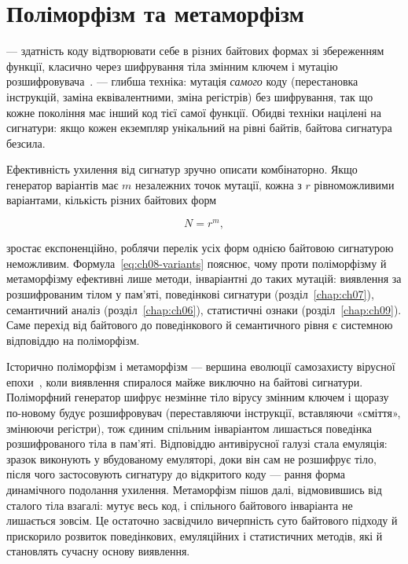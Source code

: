 \section{Поліморфізм та метаморфізм}\label{sec:ch08-poly}

 --- здатність коду відтворювати себе в різних байтових формах зі збереженням функції, класично через шифрування тіла змінним ключем і мутацію розшифровувача~\cite{szor}.  --- глибша техніка: мутація \emph{самого} коду (перестановка інструкцій, заміна еквівалентними, зміна регістрів) без шифрування, так що кожне покоління має інший код тієї самої функції. Обидві техніки націлені на сигнатури: якщо кожен екземпляр унікальний на рівні байтів, байтова сигнатура безсила.

Ефективність ухилення від сигнатур зручно описати комбінаторно. Якщо генератор варіантів має $m$ незалежних точок мутації, кожна з $r$ рівноможливими варіантами, кількість різних байтових форм

\begin{equation}
N = r^{m},
\label{eq:ch08-variants}
\end{equation}

зростає експоненційно, роблячи перелік усіх форм однією байтовою сигнатурою неможливим. Формула~\eqref{eq:ch08-variants} пояснює, чому проти поліморфізму й метаморфізму ефективні лише методи, інваріантні до таких мутацій: виявлення за розшифрованим тілом у пам'яті, поведінкові сигнатури (розділ~\ref{chap:ch07}), семантичний аналіз (розділ~\ref{chap:ch06}), статистичні ознаки (розділ~\ref{chap:ch09}). Саме перехід від байтового до поведінкового й семантичного рівня є системною відповіддю на поліморфізм.

Історично поліморфізм і метаморфізм --- вершина еволюції самозахисту вірусної епохи~\cite{szor,ch08:you}, коли виявлення спиралося майже виключно на байтові сигнатури. Поліморфний генератор шифрує незмінне тіло вірусу змінним ключем і щоразу по-новому будує розшифровувач (переставляючи інструкції, вставляючи «сміття», змінюючи регістри), тож єдиним спільним інваріантом лишається поведінка розшифрованого тіла в пам'яті. Відповіддю антивірусної галузі стала емуляція: зразок виконують у вбудованому емуляторі, доки він сам не розшифрує тіло, після чого застосовують сигнатуру до відкритого коду --- рання форма динамічного подолання ухилення. Метаморфізм пішов далі, відмовившись від сталого тіла взагалі: мутує весь код, і спільного байтового інваріанта не лишається зовсім. Це остаточно засвідчило вичерпність суто байтового підходу й прискорило розвиток поведінкових, емуляційних і статистичних методів, які й становлять сучасну основу виявлення.


